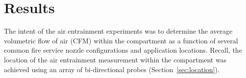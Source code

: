 \documentclass[12pt,oneside]{book}
\begin{document}




\chapter{Results}

The intent of the air entrainment experiments was to determine the average volumetric flow of air (CFM) within the compartment as a function of several common fire service nozzle configurations and application locations. Recall, the location of the air entrainment measurement within the compartment was achieved using an array of bi-directional probes (Section~\ref{sec:location}).
\end{document}
